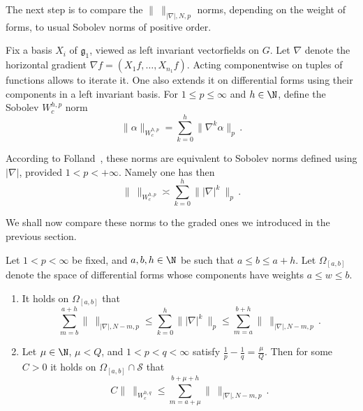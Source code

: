 The next step is to compare the $\|\ \|_{|\nabla|, N,p}$ norms, depending on the weight of forms, to usual Sobolev norms of positive order.

Fix a basis $X_i$ of $\mathfrak{g}_1$, viewed as left invariant vectorfields on $G$. Let $\nabla$ denote the horizontal gradient $\nabla f=(X_1 f,\dots,X_{n_1} f)$. Acting componentwise on tuples of functions allows to iterate it. One also extends it on differential forms using their components in a left invariant basis. For $1 \leq p \leq \infty$ and $h \in \N$, define the Sobolev $W_c^{h,p}$ norm
\[
\|\alpha\|_{W_c^{h,p}} = \sum_{k=0}^{h}\|\nabla^k\alpha\|_p \,.
\]

According to Folland~\cite[Theorem~4.10, Corollary~4.13]{Folland_1975}, these norms are equivalent to Sobolev norms defined using $|\nabla|$, provided $1<p<+\infty$. Namely one has then
\begin{equation}\label{eq:11}
\|\ \|_{W_c^{h,p}} \asymp\sum_{k=0}^{h}\||\nabla|^k \ \|_p \,.
\end{equation}

We shall now compare these norms to the graded ones we introduced in the previous section.

\begin{prop}\label{prop:Sobolev}
Let $1< p< \infty$ be fixed, and $a, b, h \in \N$ be such that $a\leq b \leq a+h$. Let $\Omega_{[a,b]}$ denote the space of differential forms whose components have weights $a\leq w \leq b$.
\begin{enumerate}%
\item \label{6.1.1} It holds on $\Omega_{[a,b]}$ that
\[
\sum_{m=b}^{a+h} \|\ \|_{|\nabla|, N-m, p} \leq
\sum_{k=0}^{h}\||\nabla|^k \ \|_p \leq
\sum_{m=a}^{b+h} \|\ \|_{|\nabla|, N-m, p}\,.
\]

\item \label{6.1.2} Let $\mu \in \N$, $\mu<Q$, and $1< p< q< \infty$ satisfy $\frac{1}{p} - \frac{1}{q} = \frac{\mu}{Q}$. Then for some $C>0$ it holds on $\Omega_{[a,b]} \cap \mathcal{S}$ that
\[
C \| \ \|_{W^{h,q}_c} \leq \sum_{m=a+ \mu}^{b+\mu + h} \| \
\|_{|\nabla|, N-m,p} \,.
\]
\end{enumerate}
\end{prop}

